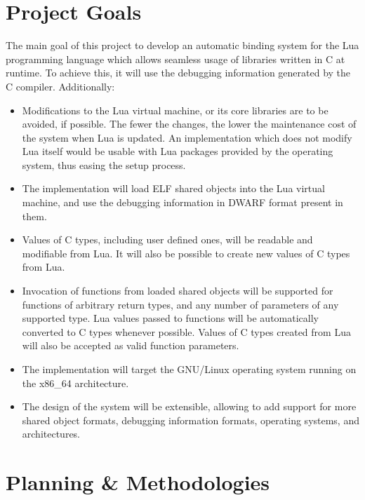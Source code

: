 \section{Project Goals}

The main goal of this project to develop an automatic binding system for the
Lua programming language which allows seamless usage of libraries written in
C at runtime. To achieve this, it will use the debugging information generated
by the C compiler. Additionally:

\begin{itemize}

	\item Modifications to the Lua virtual machine, or its core libraries are to
	be avoided, if possible. The fewer the changes, the lower the maintenance
	cost of the system when Lua is updated. An implementation which does not
	modify Lua itself would be usable with Lua packages provided by the
	operating system, thus easing the setup process.

	\item The implementation will load \gls{ELF} shared objects into the Lua
	virtual machine, and use the debugging information in \gls{DWARF} format
	present in them.

	\item Values of C types, including user defined ones, will be readable and
	modifiable from Lua. It will also be possible to create new values of
	C types from Lua.

	\item Invocation of functions from loaded shared objects will be supported
	for functions of arbitrary return types, and any number of parameters of any
	supported type. Lua values passed to functions will be automatically
	converted to C types whenever possible. Values of C types created from Lua
	will also be accepted as valid function parameters.

	\item The implementation will target the GNU/Linux operating system running
	on the x86\_64 architecture.

	\item The design of the system will be extensible, allowing to add support
	for more shared object formats, debugging information formats, operating
	systems, and architectures.

\end{itemize}


\section{Planning \& Methodologies}


